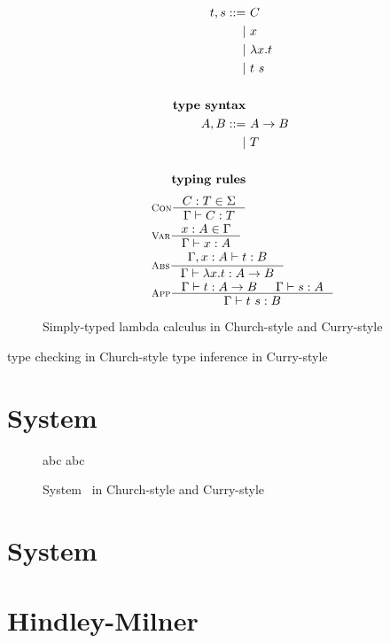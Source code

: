 \begin{figure}
\begin{singlespace}
\begin{minipage}{.46\textwidth}
\begin{align*}
t,s ::= &~ C           \\
      | &~ x           \\
      | &~ \lambda x    . t \\
      | &~ t ~ s       \\
\\
\textbf{type syntax} \\
A,B ::= &~ A -> B \\
      | &~ T      \\
\\
\textbf{typing rules}
\end{align*}
\vspace*{-2.5em}
\begin{align*}\qquad
& \inference[\sc Con]{C:T \in \Sigma}{\Gamma |- C:T} \\
& \inference[\sc Var]{x:A \in \Gamma}{\Gamma |- x:A} \\
& \inference[\sc Abs]{\Gamma,x:A |- t : B}{\Gamma |- \lambda x   .t : A -> B} \\
& \inference[\sc App]{\Gamma |- t : A -> B & \Gamma |- s : A}{\Gamma |- t~s : B} \\
\end{align*}
\end{minipage}
\caption{Simply-typed lambda calculus in Church-style and Curry-style}
\label{fig:stlc}
\end{singlespace}
\end{figure}

type checking in Church-style
type inference in Curry-style

\section{System \F}
\begin{figure} \F
\begin{singlespace}
	abc
	abc
\caption{System \F\ in Church-style and Curry-style}
\label{fig:f}
\end{singlespace}
\end{figure}



\section{System \Fw}

\section{Hindley-Milner}
